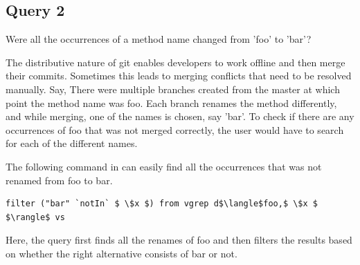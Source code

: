 \subsection{Query 2}
Were all the occurrences of a method name changed from 'foo' to 'bar'?

The distributive nature of git enables developers to work offline and then merge their commits. Sometimes this leads to merging conflicts that need to be resolved manually. Say, There were multiple branches created from the master at which point the method name was foo. Each branch renames the method differently, and while merging, one of the names is chosen, say 'bar'. To check if there are any occurrences of foo that was not merged correctly, the user would have to search for each of the different names. 

The following command in \gql can easily find all the occurrences that was not renamed from foo to bar.\\
\begin{lstlisting}
filter ("bar" `notIn` $ \$x $) from vgrep d$\langle$foo,$ \$x $ $\rangle$ vs
\end{lstlisting}

Here, the query first finds all the renames of foo and then filters the results based on whether the right alternative consists of bar or not. 
 










